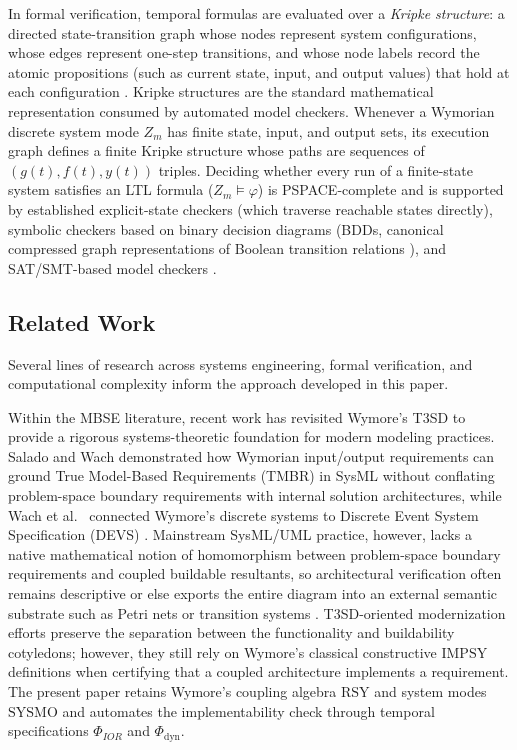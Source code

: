 In formal verification, temporal formulas are evaluated over a \emph{Kripke structure}: a directed state-transition graph whose nodes represent system configurations, whose edges represent one-step transitions, and whose node labels record the atomic propositions (such as current state, input, and output values) that hold at each configuration \citep{BaierKatoen2008}. Kripke structures are the standard mathematical representation consumed by automated model checkers. Whenever a Wymorian discrete system mode $Z_m$ has finite state, input, and output sets, its execution graph defines a finite Kripke structure whose paths are sequences of $(g(t),f(t),y(t))$ triples. Deciding whether every run of a finite-state system satisfies an LTL formula ($Z_m\models\varphi$) is PSPACE-complete \citep{SistlaClarke1985} and is supported by established explicit-state checkers (which traverse reachable states directly), symbolic checkers based on binary decision diagrams (BDDs, canonical compressed graph representations of Boolean transition relations \citep{BurchClarkeMcMillanDill1992}), and SAT/SMT-based model checkers \citep{BiereCimattiClarkeZhu1999,BaierKatoen2008,deMouraZ32008}.

\subsection{Related Work}
\label{sec:related-work}
Several lines of research across systems engineering, formal verification, and computational complexity inform the approach developed in this paper.

Within the MBSE literature, recent work has revisited Wymore's T3SD to provide a rigorous systems-theoretic foundation for modern modeling practices. Salado and Wach \citep{salado2019wymore,salado2019mbse} demonstrated how Wymorian input/output requirements can ground True Model-Based Requirements (TMBR) in SysML without conflating problem-space boundary requirements with internal solution architectures, while Wach et al.\ \citep{wach2021devs} connected Wymore's discrete systems to Discrete Event System Specification (DEVS) \citep{ZeiglerPraehoferKim2000}. Mainstream SysML/UML practice, however, lacks a native mathematical notion of homomorphism between problem-space boundary requirements and coupled buildable resultants, so architectural verification often remains descriptive or else exports the entire diagram into an external semantic substrate such as Petri nets or transition systems \citep{Jensen1997,ZeiglerPraehoferKim2000}. T3SD-oriented modernization efforts preserve the separation between the functionality and buildability cotyledons; however, they still rely on Wymore's classical constructive $\mathrm{IMPSY}$ definitions when certifying that a coupled architecture implements a requirement. The present paper retains Wymore's coupling algebra $\mathrm{RSY}$ and system modes $\mathrm{SYSMO}$ and automates the implementability check through temporal specifications $\Phi_{IOR}$ and $\Phi_{\mathrm{dyn}}$.

